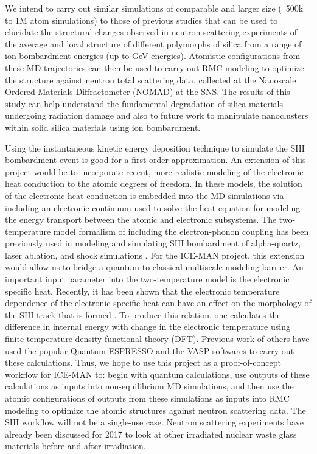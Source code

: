 We intend to carry out similar simulations of comparable and larger size (~500k to 1M atom simulations) to those of previous studies that can be used to elucidate the structural changes observed in neutron scattering experiments of the average and local structure of different polymorphs of silica from a range of ion bombardment energies (up to GeV energies). Atomistic configurations from these MD trajectories can then be used to carry out RMC modeling to optimize the structure against neutron total scattering data, collected at the Nanoscale Ordered Materials Diffractometer (NOMAD) at the SNS. The results of this study can help understand the fundamental degradation of silica materials undergoing radiation damage \cite{Duffy2007, Rutherford2007} and also to future work to manipulate nanoclusters within solid silica materials using ion bombardment\cite{Ridgway2011}. 

Using the instantaneous kinetic energy deposition technique to simulate the SHI bombardment event is good for a first order approximation. An extension of this project would be to incorporate recent, more realistic modeling \cite{Duffy2007, Rutherford2007, Phillips2010, Leino2015, Khara2016} of the electronic heat conduction to the atomic degrees of freedom. In these models, the solution of the electronic heat conduction is embedded into the MD simulations via including an electronic continuum used to solve the heat equation for modeling the energy transport between the atomic and electronic subsystems. The two-temperature model formalism of including the electron-phonon coupling has been previously used in modeling and simulating SHI bombardment of alpha-quartz, laser ablation, and shock simulations \cite{Phillips2010}. For the ICE-MAN project, this extension would allow us to bridge a quantum-to-classical multiscale-modeling barrier. An important input parameter into the two-temperature model is the electronic specific heat. Recently, it has been shown that the electronic temperature dependence of the electronic specific heat can have an effect on the morphology of the SHI track that is formed \cite{Leino2015, Khara2016}.  To produce this relation, one calculates the difference in internal energy with change in the electronic temperature using finite-temperature density functional theory (DFT). Previous work of others have used the popular Quantum ESPRESSO \cite{Giannozzi2009, QEwebsite} and the VASP \cite{Kresse1996, Kresse1996a, VASPwebsite} softwares to carry out these calculations. Thus, we hope to use this project as a proof-of-concept workflow for ICE-MAN to: begin with quantum calculations, use outputs of these calculations as inputs into non-equilibrium MD simulations, and then use the atomic configurations of outputs from these simulations as inputs into RMC modeling to optimize the atomic structures against neutron scattering data. The SHI workflow will not be a single-use case. Neutron scattering experiments have already been discussed for 2017 to look at other irradiated nuclear waste glass materials before and after irradiation.
